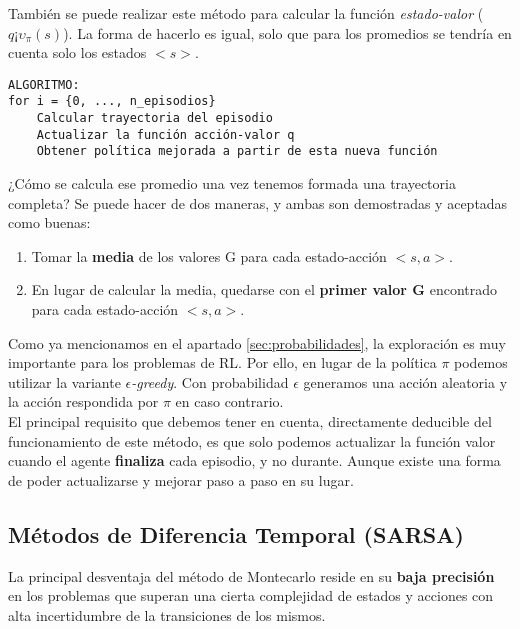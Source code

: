 \documentclass[11pt,fleqn]{book} %
\begin{document}
También se puede realizar este método para calcular la función \textit{estado-valor} ($q¡\upsilon_\pi(s)$). La forma de hacerlo es igual, solo que para los promedios se tendría en cuenta solo los estados $<s>$.

\begin{verbatim}
ALGORITMO:
for i = {0, ..., n_episodios}
    Calcular trayectoria del episodio
    Actualizar la función acción-valor q
    Obtener política mejorada a partir de esta nueva función
\end{verbatim}

¿Cómo se calcula ese promedio una vez tenemos formada una trayectoria completa? Se puede hacer de dos maneras, y ambas son demostradas y aceptadas como buenas: \\

\begin{enumerate}
	\item Tomar la \textbf{media} de los valores G para cada estado-acción $<s,a>$. \\
	
	\item En lugar de calcular la media, quedarse con el \textbf{primer valor G} encontrado para cada estado-acción $<s,a>$. \\
\end{enumerate}

Como ya mencionamos en el apartado \ref{sec:probabilidades}, la exploración es muy importante para los problemas de RL. Por ello, en lugar de la política $\pi$ podemos utilizar la variante \textit{$\epsilon$-greedy}. Con probabilidad $\epsilon$ generamos una acción aleatoria y la acción respondida por $\pi$ en caso contrario. \\

El principal requisito que debemos tener en cuenta, directamente deducible del funcionamiento de este método, es que solo podemos actualizar la función valor cuando el agente \textbf{finaliza} cada episodio, y no durante. Aunque existe una forma de poder actualizarse y mejorar paso a paso en su lugar.

\subsection{Métodos de Diferencia Temporal (SARSA)}\label{sec:sarsa}

La principal desventaja del método de Montecarlo reside en su \textbf{baja precisión} en los problemas que superan una cierta complejidad de estados y acciones con alta incertidumbre de la transiciones de los mismos.\\
\end{document}
